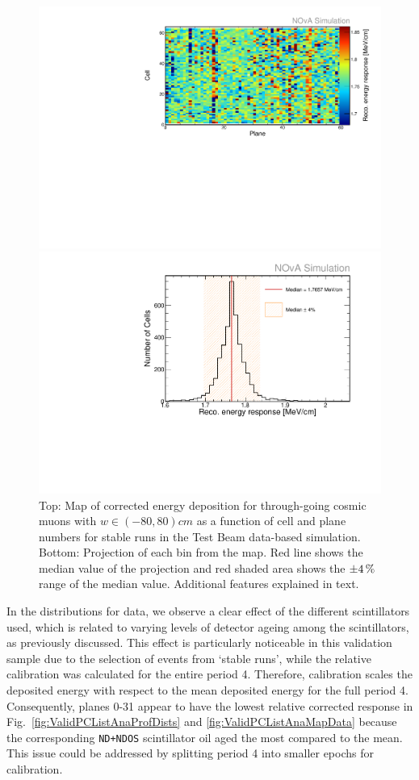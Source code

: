 \begin{figure}[!ht]
  \centering
  \includegraphics[width=0.7\linewidth]{Plots/PCListAna/TBSimulation_CP_recomevcm_ts_zoomed.pdf}
  
  \includegraphics[width=0.7\linewidth]{Plots/PCListAna/Variation_recomevcm_TBSimulation_LimW.pdf}
  \caption[Map of corrected energy deposition for through-going cosmic muons in simulation]{Top: Map of corrected energy deposition for through-going cosmic muons with $w\in\left(-80,80\right)\unit{cm}$ as a function of cell and plane numbers for stable runs in the Test Beam data-based simulation. Bottom: Projection of each bin from the map. Red line shows the median value of the projection and red shaded area shows the $\pm\unit[4]{\%}$ range of the median value. Additional features explained in text.}
  \label{fig:ValidPCListAnaMapSim}
\end{figure}

In the distributions for data, we observe a clear effect of the different scintillators used, which is related to varying levels of detector ageing among the scintillators, as previously discussed. This effect is particularly noticeable in this validation sample due to the selection of events from `stable runs', while the relative calibration was calculated for the entire period 4. Therefore, calibration scales the deposited energy with respect to the mean deposited energy for the full period 4. Consequently, planes 0-31 appear to have the lowest relative corrected response in Fig.~\ref{fig:ValidPCListAnaProfDists} and \ref{fig:ValidPCListAnaMapData} because the corresponding \texttt{ND+NDOS} scintillator oil aged the most compared to the mean. This issue could be addressed by splitting period 4 into smaller epochs for calibration.

